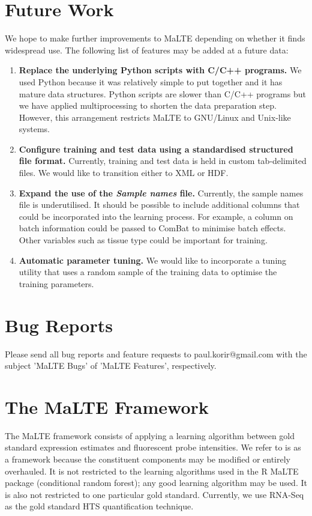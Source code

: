 \documentclass[a4paper,12pt]{article}
\begin{document}
\section{Future Work}
We hope to make further improvements to MaLTE depending on whether it finds widespread use. The following list of features may be added at a future data:
\begin{enumerate}
\item \textbf{Replace the underlying Python scripts with C/C++ programs.} We used Python because it was relatively simple to put together and it has mature data structures. Python scripts are slower than C/C++ programs but we have applied multiprocessing to shorten the data preparation step. However, this arrangement restricts MaLTE to GNU/Linux and Unix-like systems.
\item \textbf{Configure training and test data using a standardised structured file format.} Currently, training and test data is held in custom tab-delimited files. We would like to transition either to XML or HDF.
\item \textbf{Expand the use of the \textit{Sample names} file.} Currently, the sample names file is underutilised. It should be possible to include additional columns that could be incorporated into the learning process. For example, a column on batch information could be passed to ComBat to minimise batch effects. Other variables such as tissue type could be important for training.
\item \textbf{Automatic parameter tuning.} We would like to incorporate a tuning utility that uses a random sample of the training data to optimise the training parameters.
\end{enumerate}

\section{Bug Reports}
Please send all bug reports and feature requests to paul.korir@gmail.com with the subject 'MaLTE Bugs' of 'MaLTE Features', respectively.

\pagebreak
\appendix
\section{The MaLTE Framework}

The MaLTE framework consists of applying a learning algorithm between gold standard expression estimates and fluorescent probe intensities. We refer to is as a framework because the constituent components may be modified or entirely overhauled. It is not restricted to the learning algorithms used in the R MaLTE package (conditional random forest); any good learning algorithm may be used. It is also not restricted to one particular gold standard. Currently, we use RNA-Seq as the gold standard HTS quantification technique.
\end{document}
